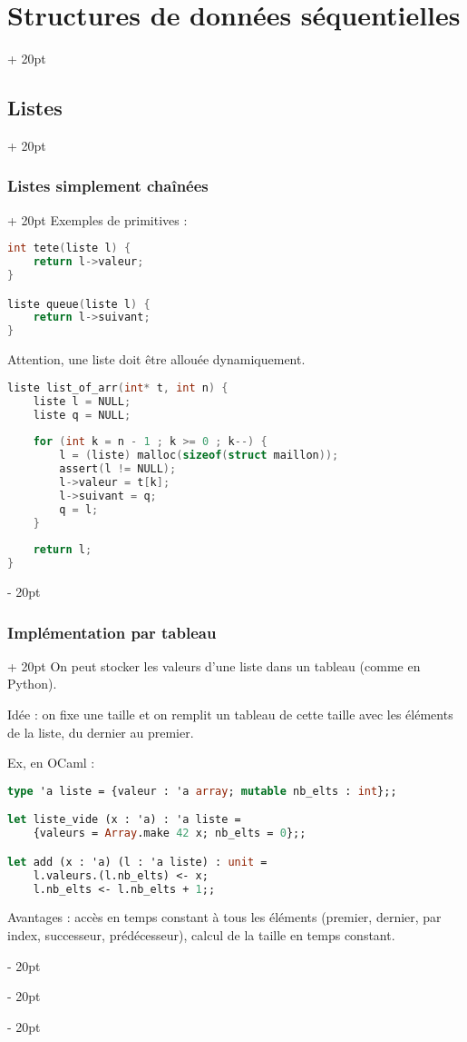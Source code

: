 \documentclass[a4paper, 12pt, twoside]{article}
\newcommand{\ind}[1][20pt]{\advance\leftskip + #1}
\newcommand{\deind}[1][20pt]{\advance\leftskip - #1}
\newenvironment{indt}[2][20pt]{#2 \par \ind[#1]}{\par \deind} %
\begin{document}
\begin{indt}{\section{Structures de données séquentielles}}
\begin{indt}{\subsection{Listes}}
\begin{indt}{\subsubsection{Listes simplement chaînées}}
                Exemples de primitives :
                
                \begin{lstlisting}[language=C, xleftmargin=80pt]
int tete(liste l) {
    return l->valeur;
}

liste queue(liste l) {
    return l->suivant;
}\end{lstlisting}
                
                Attention, une liste doit être allouée dynamiquement.
                
                \begin{lstlisting}[language=C, xleftmargin=80pt]
liste list_of_arr(int* t, int n) {
    liste l = NULL;
    liste q = NULL;
    
    for (int k = n - 1 ; k >= 0 ; k--) {
        l = (liste) malloc(sizeof(struct maillon));
        assert(l != NULL);
        l->valeur = t[k];
        l->suivant = q;
        q = l;
    }
    
    return l;
}\end{lstlisting}
            \end{indt}
            
            \vspace{6pt}
            
            \begin{indt}{\subsubsection{Implémentation par tableau}}
                On peut stocker les valeurs d'une liste dans un tableau (comme en Python).
                
                Idée : on fixe une taille et on remplit un tableau de cette taille avec les éléments de la liste, du dernier au premier.
                
                Ex, en OCaml :
                \begin{lstlisting}[language=Caml, xleftmargin=80pt]
type 'a liste = {valeur : 'a array; mutable nb_elts : int};;

let liste_vide (x : 'a) : 'a liste =
    {valeurs = Array.make 42 x; nb_elts = 0};;

let add (x : 'a) (l : 'a liste) : unit =
    l.valeurs.(l.nb_elts) <- x;
    l.nb_elts <- l.nb_elts + 1;;\end{lstlisting}
                
                Avantages : accès en temps constant à tous les éléments (premier, dernier, par index, successeur, prédécesseur), calcul de la taille en temps constant.
                

\end{indt}
\end{indt}
\end{indt}
\end{document}

